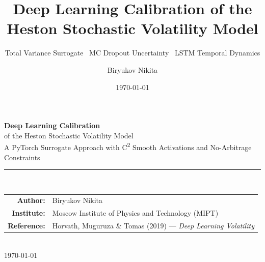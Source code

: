\documentclass[aspectratio=169, 10pt]{beamer}
\title[Heston Deep Learning]{%
  Deep Learning Calibration of the\\
  Heston Stochastic Volatility Model}
\subtitle{Total Variance Surrogate \textperiodcentered\ MC Dropout Uncertainty
          \textperiodcentered\ LSTM Temporal Dynamics}
\author{Biryukov Nikita}
\date{\today}
\institute{Moscow Institute of Physics and Technology (MIPT)}
\begin{document}

{
\begin{frame}
  \vspace{2em}
  \begin{center}
    {\LARGE\bfseries\color{hestonblue} Deep Learning Calibration}\\[0.5em]
    {\large\color{hestonblue} of the Heston Stochastic Volatility Model}\\[1.8em]
    {\small A PyTorch Surrogate Approach with
            C\textsuperscript{2} Smooth Activations and No-Arbitrage Constraints}\\[1.8em]
    {\color{hestonblue}\rule{0.7\textwidth}{0.4pt}}\\[1em]
    \begin{tabular}{rl}
      \textbf{Author:}    & Biryukov Nikita \\[0.3em]
      \textbf{Institute:} & Moscow Institute of Physics and Technology (MIPT) \\[0.3em]
      \textbf{Reference:} & Horvath, Muguruza \& Tomas (2019) ---
                            \textit{Deep Learning Volatility} \\
    \end{tabular}\\[1em]
    {\small\color{gray}\today}
  \end{center}
\end{frame}
}
\end{document}
